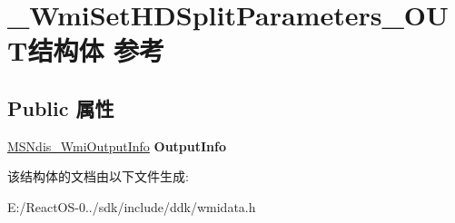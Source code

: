 \hypertarget{struct___wmi_set_h_d_split_parameters___o_u_t}{}\section{\+\_\+\+Wmi\+Set\+H\+D\+Split\+Parameters\+\_\+\+O\+U\+T结构体 参考}
\label{struct___wmi_set_h_d_split_parameters___o_u_t}
\subsection*{Public 属性}
\begin{DoxyCompactItemize}
\item 
\mbox{\label{struct___wmi_set_h_d_split_parameters___o_u_t_a92e4f8df360acea2369b9ff7908ae993}} 
\hyperlink{struct___m_s_ndis___wmi_output_info}{M\+S\+Ndis\+\_\+\+Wmi\+Output\+Info} {\bfseries Output\+Info}
\end{DoxyCompactItemize}


该结构体的文档由以下文件生成\+:\begin{DoxyCompactItemize}
\item 
E\+:/\+React\+O\+S-\/0../sdk/include/ddk/wmidata.\+h\end{DoxyCompactItemize}
